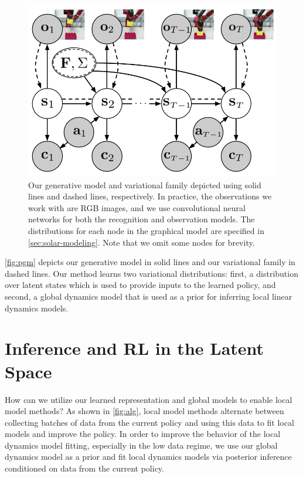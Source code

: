 \begin{figure}
    \centering
    \includegraphics[width=0.9\linewidth]{img/solar/pgm.png}
    \caption{Our generative model and variational family depicted using solid lines and dashed lines, respectively. In practice, the observations we work with are RGB images, and we use convolutional neural networks for both the recognition and observation models. The distributions for each node in the graphical model are specified in \autoref{sec:solar-modeling}. Note that we omit some nodes for brevity.}
    \label{fig:pgm}
    \vspace{-.5em}
\end{figure}

\autoref{fig:pgm} depicts our generative model in solid lines and our variational family in dashed lines. Our method learns two variational distributions: first, a distribution over latent states which is used to provide inputs to the learned policy, and second, a global dynamics model that is used as a prior for inferring local linear dynamics models.


\section{Inference and RL in the Latent Space}
\label{sec:inference}

How can we utilize our learned representation and global models to enable local model methods? As shown in \autoref{fig:alg}, local model methods alternate between collecting batches of data from the current policy and using this data to fit local models and improve the policy. In order to improve the behavior of the local dynamics model fitting, especially in the low data regime, we use our global dynamics model as a prior and fit local dynamics models via posterior inference conditioned on data from the current policy.

